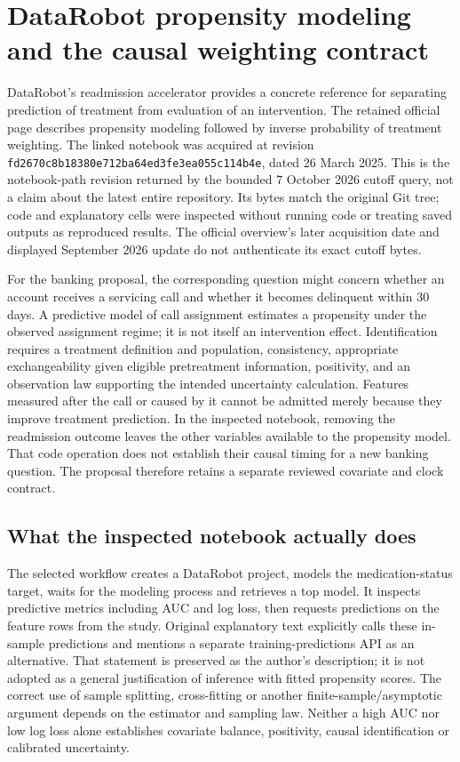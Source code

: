 \section{DataRobot propensity modeling and the causal weighting contract}
\label{sec:exec25-datarobot-reuse}
DataRobot's readmission accelerator provides a concrete reference for separating
prediction of treatment from evaluation of an intervention. The retained
official page describes propensity modeling followed by inverse probability
of treatment weighting. The linked notebook was acquired at revision
\texttt{fd2670c8b18380e712ba}\allowbreak\texttt{64ed3fe3ea055c114b4e},
dated 26 March 2025. This is the notebook-path revision returned by the bounded
7 October 2026 cutoff query, not a claim about the latest entire repository.
Its bytes match the original Git tree; code and explanatory cells were
inspected without running code or treating saved outputs as reproduced results.
The official overview's later acquisition date and displayed September 2026
update do not authenticate its exact cutoff bytes.~\citep{exec13_ch_datarobot,exec25_datarobot_notebook}

For the banking proposal, the corresponding question might concern whether
an account receives a servicing call and whether it becomes delinquent within
30 days. A predictive model of call assignment estimates a propensity under
the observed assignment regime; it is not itself an intervention effect.
Identification requires a treatment definition and population, consistency,
appropriate exchangeability given eligible pretreatment information, positivity,
and an observation law supporting the intended uncertainty calculation.
Features measured after the call or caused by it cannot be admitted merely
because they improve treatment prediction. In the inspected notebook, removing
the readmission outcome leaves the other variables available to the propensity
model. That code operation does not establish their causal timing for a new
banking question. The proposal therefore retains a separate reviewed covariate
and clock contract.~\citep{exec25_datarobot_notebook,exec25_datarobot_choice}

\subsection{What the inspected notebook actually does}
The selected workflow creates a DataRobot project, models the medication-status
target, waits for the modeling process and retrieves a top model. It inspects
predictive metrics including AUC and log loss, then requests predictions on the
feature rows from the study. Original explanatory text explicitly calls these
in-sample predictions and mentions a separate training-predictions API as an
alternative. That statement is preserved as the author's description; it is
not adopted as a general justification of inference with fitted propensity
scores. The correct use of sample splitting, cross-fitting or another
finite-sample/asymptotic argument depends on the estimator and sampling law.
Neither a high AUC nor low log loss alone establishes covariate balance,
positivity, causal identification or calibrated uncertainty.~\citep{exec25_datarobot_notebook,exec25_datarobot_choice}

